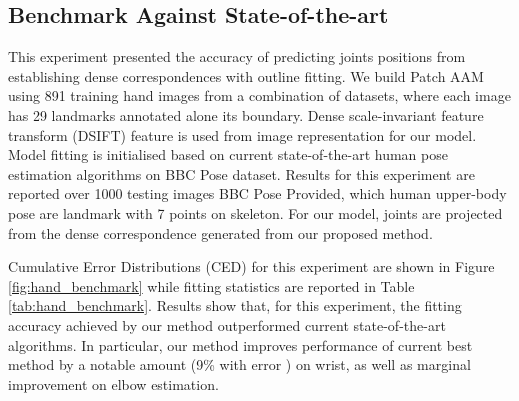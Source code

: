 \subsection{Benchmark Against State-of-the-art}
\label{exp:benchmark}
This experiment presented the accuracy of predicting joints positions from establishing dense correspondences with outline fitting. We build Patch AAM using 891 training hand images from a combination of datasets, where each image has 29 landmarks annotated alone its boundary. Dense scale-invariant feature transform (DSIFT)\cite{PoseletsICCV09} feature is used from image representation for our model. Model fitting is initialised based on current state-of-the-art human pose estimation algorithms on BBC Pose dataset. Results for this experiment are reported over 1000 testing images BBC Pose Provided, which human upper-body pose are landmark with 7 points on skeleton. For our model, joints are projected from the dense correspondence generated from our proposed method.

Cumulative Error Distributions (CED) for this experiment are shown in Figure \ref{fig:hand_benchmark} while fitting statistics are reported in Table \ref{tab:hand_benchmark}. Results show that, for this experiment, the fitting accuracy achieved by our method outperformed current state-of-the-art algorithms. In particular, our method improves performance of current best method \cite{pfister2015flowing} by a notable amount (9\% with error \leq 6pt) on wrist, as well as marginal improvement on elbow estimation.


